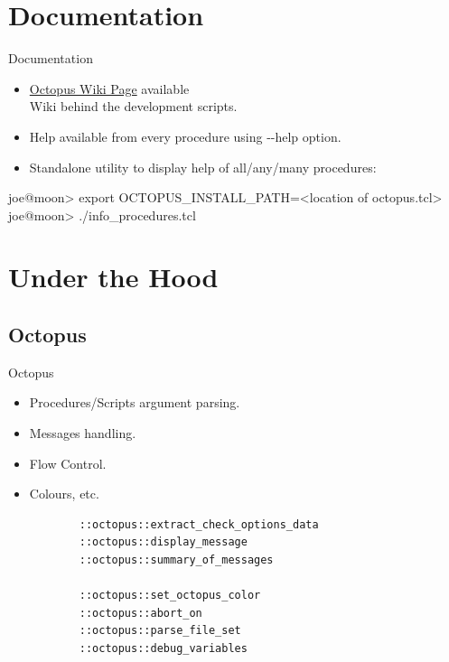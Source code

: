 \documentclass[handout]{beamer}
\begin{document}
\section{Documentation}
\begin{frame}[fragile]{Documentation}
	\begin{itemize}
	\item \href{https://github.com/octavsly/octopus/wiki}{Octopus Wiki Page} available \\
		Wiki behind the development scripts.
	\pause
	\item Help available from every procedure using \alert{-{}-help} option.
	\pause
	\item Standalone utility to display help of all/any/many procedures:
	\pause
	\end{itemize}
	{\small
	\begin{semiverbatim}
\alert{joe@moon> export OCTOPUS_INSTALL_PATH=<location of octopus.tcl>}
\alert{joe@moon> ./info_procedures.tcl}
	\end{semiverbatim}
	}
\end{frame}

\section{Under the Hood}
\subsection{Octopus}
\begin{frame}[fragile]{Octopus}
	\begin{itemize}
	 \item Procedures/Scripts argument parsing.
	 \item Messages handling.
	 \item Flow Control.
	 \item Colours, etc.
	\end{itemize}

	{\small
	\begin{verbatim}
           ::octopus::extract_check_options_data
           ::octopus::display_message
           ::octopus::summary_of_messages
        
           ::octopus::set_octopus_color
           ::octopus::abort_on
           ::octopus::parse_file_set
           ::octopus::debug_variables
	\end{verbatim}
	}
\end{frame}
\end{document}
